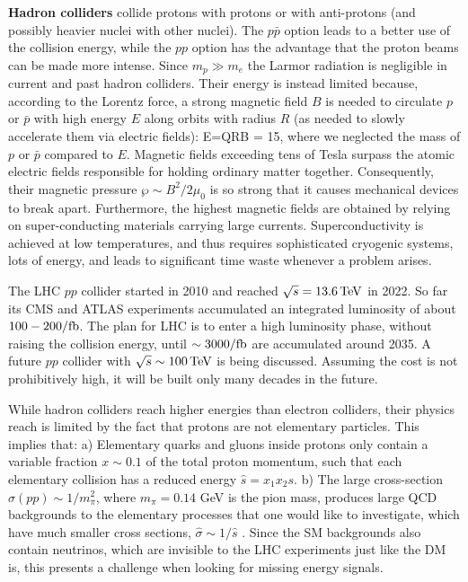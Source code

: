 \begin{description}
\item  {\bf Hadron colliders} collide protons with protons or with anti-protons (and possibly heavier nuclei with other nuclei).
The $p\bar p$ option leads to a better use of the collision energy, while the $pp$ option has the advantage that the proton beams can be made more intense.
Since $m_p\gg m_e$ the Larmor radiation is negligible in current and past hadron colliders.
Their energy is instead limited because, according to the Lorentz force, 
a strong magnetic field $B$ is needed to circulate 
$p$ or $\bar p$ with high energy $E$ along orbits with radius $R$
(as needed to slowly accelerate them via electric fields):
\beq  E=QRB = 15\TeV {},
\eeq
where we neglected the mass of $p$ or $\bar p$ compared to $E$.
Magnetic fields exceeding tens of Tesla surpass the atomic electric fields responsible for holding ordinary matter together.
Consequently, their magnetic pressure $\wp \sim B^2/2\mu_0$ is so strong that it causes mechanical devices to break apart.
Furthermore, the highest magnetic fields are obtained by relying on super-conducting materials carrying large currents. Superconductivity is achieved at
low temperatures, and thus requires sophisticated cryogenic systems, lots of energy, and leads to significant time waste whenever a problem arises.

The LHC $pp$ collider started in 2010 and reached $\sqrt{s}=13.6\,{\rm TeV}$ in 2022.
So far its CMS and ATLAS experiments accumulated an integrated luminosity of about $ 100-200/{\rm fb}$.
The plan for LHC is to enter a high luminosity phase, without raising the collision energy,
until  $\sim 3000/{\rm fb}$ are accumulated around 2035.
A future $pp$ collider with $\sqrt{s}\sim 100\,{\rm TeV}$ is being discussed. Assuming the cost is not prohibitively high, 
it will be built only many decades in the future.

While hadron colliders reach higher energies than electron colliders, 
their physics reach is limited by the fact that
protons are not elementary particles.  This implies that:
a) Elementary quarks and gluons inside protons only contain a variable fraction $x\sim 0.1$ of the total proton momentum, such that each elementary collision has a reduced energy ${\hat{s}} = x_1 x_2 s$.
b) The large cross-section $\sigma(pp)\sim 1/m_\pi^2$, where $m_\pi=0.14$ GeV is the pion mass, produces large QCD backgrounds to the elementary
processes that one would like to investigate, which have much smaller cross sections, $\hat \sigma \sim 1/\hat s$ .
Since the SM backgrounds also contain neutrinos, which are invisible to the LHC experiments just like the DM is, this presents a challenge 
 when looking for missing energy signals.
 

\end{description}

